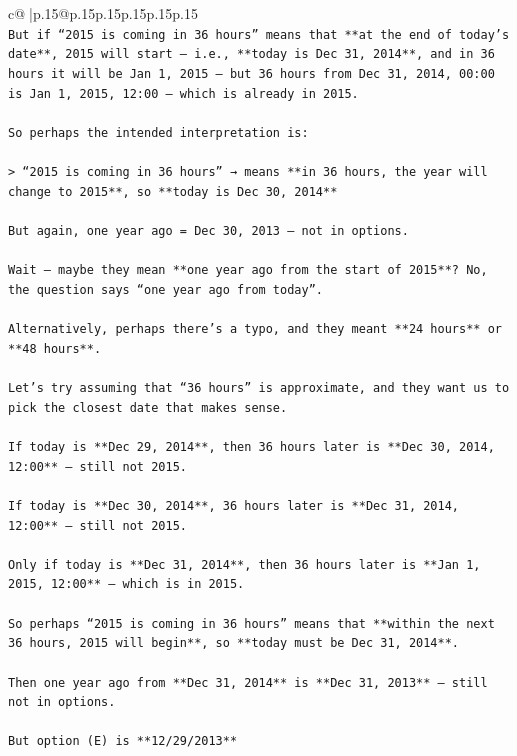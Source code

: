 \documentclass{article}
\begin{document}
{\begin{supertabular}{c@{$\;$}|p{.15\linewidth}@{}p{.15\linewidth}p{.15\linewidth}p{.15\linewidth}p{.15\linewidth}p{.15\linewidth}}
{{{\\ 
\texttt{But if “2015 is coming in 36 hours” means that **at the end of today’s date**, 2015 will start — i.e., **today is Dec 31, 2014**, and in 36 hours it will be Jan 1, 2015 — but 36 hours from Dec 31, 2014, 00:00 is Jan 1, 2015, 12:00 — which is already in 2015.} \\
\\ 
\texttt{So perhaps the intended interpretation is:} \\
\\ 
\texttt{> “2015 is coming in 36 hours” → means **in 36 hours, the year will change to 2015**, so **today is Dec 30, 2014**} \\
\\ 
\texttt{But again, one year ago = Dec 30, 2013 — not in options.} \\
\\ 
\texttt{Wait — maybe they mean **one year ago from the start of 2015**? No, the question says “one year ago from today”.} \\
\\ 
\texttt{Alternatively, perhaps there’s a typo, and they meant **24 hours** or **48 hours**.} \\
\\ 
\texttt{Let’s try assuming that “36 hours” is approximate, and they want us to pick the closest date that makes sense.} \\
\\ 
\texttt{If today is **Dec 29, 2014**, then 36 hours later is **Dec 30, 2014, 12:00** — still not 2015.} \\
\\ 
\texttt{If today is **Dec 30, 2014**, 36 hours later is **Dec 31, 2014, 12:00** — still not 2015.} \\
\\ 
\texttt{Only if today is **Dec 31, 2014**, then 36 hours later is **Jan 1, 2015, 12:00** — which is in 2015.} \\
\\ 
\texttt{So perhaps “2015 is coming in 36 hours” means that **within the next 36 hours, 2015 will begin**, so **today must be Dec 31, 2014**.} \\
\\ 
\texttt{Then one year ago from **Dec 31, 2014** is **Dec 31, 2013** — still not in options.} \\
\\ 
\texttt{But option (E) is **12/29/2013**} \\
\\ 
}}}
\end{supertabular}}
\end{document}
